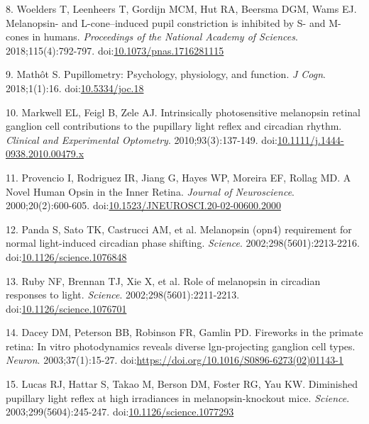 \documentclass[
]{article}
\begin{document}
\leavevmode\hypertarget{ref-Woelders2018}{}%
8. Woelders T, Leenheers T, Gordijn MCM, Hut RA, Beersma DGM, Wams EJ. Melanopsin- and L-cone--induced pupil constriction is inhibited by S- and M-cones in humans. \emph{Proceedings of the National Academy of Sciences}. 2018;115(4):792-797. doi:\href{https://doi.org/10.1073/pnas.1716281115}{10.1073/pnas.1716281115}

\leavevmode\hypertarget{ref-Mathot2018}{}%
9. Mathôt S. Pupillometry: Psychology, physiology, and function. \emph{J Cogn}. 2018;1(1):16. doi:\href{https://doi.org/10.5334/joc.18}{10.5334/joc.18}

\leavevmode\hypertarget{ref-Markwell2010}{}%
10. Markwell EL, Feigl B, Zele AJ. Intrinsically photosensitive melanopsin retinal ganglion cell contributions to the pupillary light reflex and circadian rhythm. \emph{Clinical and Experimental Optometry}. 2010;93(3):137-149. doi:\href{https://doi.org/10.1111/j.1444-0938.2010.00479.x}{10.1111/j.1444-0938.2010.00479.x}

\leavevmode\hypertarget{ref-Provencio2000}{}%
11. Provencio I, Rodriguez IR, Jiang G, Hayes WP, Moreira EF, Rollag MD. A Novel Human Opsin in the Inner Retina. \emph{Journal of Neuroscience}. 2000;20(2):600-605. doi:\href{https://doi.org/10.1523/JNEUROSCI.20-02-00600.2000}{10.1523/JNEUROSCI.20-02-00600.2000}

\leavevmode\hypertarget{ref-Panda2002}{}%
12. Panda S, Sato TK, Castrucci AM, et al. Melanopsin (opn4) requirement for normal light-induced circadian phase shifting. \emph{Science}. 2002;298(5601):2213-2216. doi:\href{https://doi.org/10.1126/science.1076848}{10.1126/science.1076848}

\leavevmode\hypertarget{ref-Ruby2002}{}%
13. Ruby NF, Brennan TJ, Xie X, et al. Role of melanopsin in circadian responses to light. \emph{Science}. 2002;298(5601):2211-2213. doi:\href{https://doi.org/10.1126/science.1076701}{10.1126/science.1076701}

\leavevmode\hypertarget{ref-Dacey2003}{}%
14. Dacey DM, Peterson BB, Robinson FR, Gamlin PD. Fireworks in the primate retina: In vitro photodynamics reveals diverse lgn-projecting ganglion cell types. \emph{Neuron}. 2003;37(1):15-27. doi:\href{https://doi.org/https://doi.org/10.1016/S0896-6273(02)01143-1}{https://doi.org/10.1016/S0896-6273(02)01143-1}

\leavevmode\hypertarget{ref-Lucas2003}{}%
15. Lucas RJ, Hattar S, Takao M, Berson DM, Foster RG, Yau KW. Diminished pupillary light reflex at high irradiances in melanopsin-knockout mice. \emph{Science}. 2003;299(5604):245-247. doi:\href{https://doi.org/10.1126/science.1077293}{10.1126/science.1077293}
\end{document}
